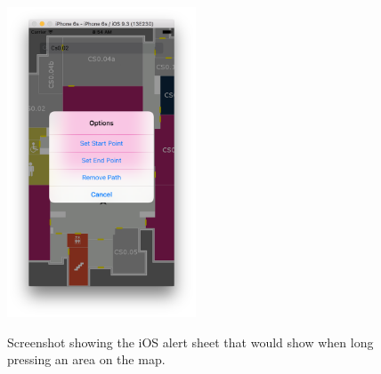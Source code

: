 \documentclass[12pt,a4paper]{report}
\begin{document}
\begin{figure}[]
\centering
\includegraphics[width=0.5\textwidth]{images-implementation/IOSAlertSheet.png}
\label{IOSAlertSheet}
\caption{Screenshot showing the iOS alert sheet that would show when long pressing an area on the map.}
\end{figure}
\end{document}
